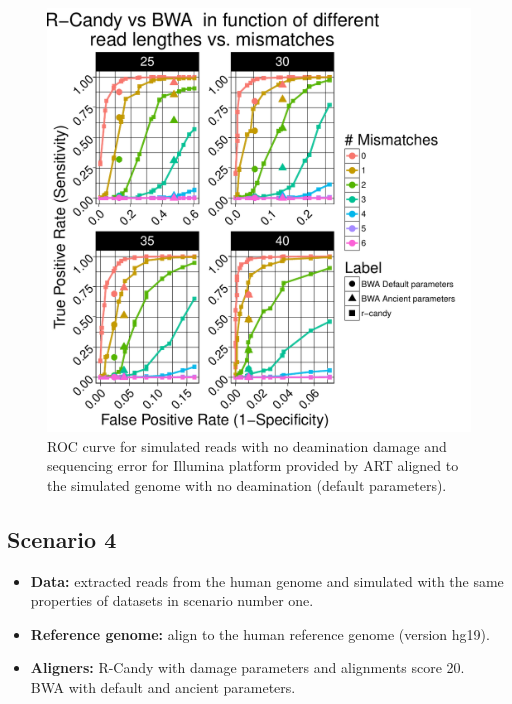 \documentclass[11pt,a4paper]{report}
\begin{document}
\begin{figure}[H]
\centering
\includegraphics[width=12cm]{pictures/bROC_DS3_ART.pdf}
\caption{ROC curve for simulated reads with no deamination damage and sequencing 
error for Illumina platform provided by ART aligned to the simulated genome
         with no deamination (default parameters).}
\label{DS3_ART}
\end{figure}


\subsection{Scenario 4}
 
  \begin{itemize}

   \item \textbf{Data:} extracted reads from the human genome and simulated 
with the same properties of datasets in scenario number one.
   
   \item \textbf{Reference genome:} align to the human reference genome (version hg19).
   
    \item \textbf{Aligners:} R-Candy with damage parameters and alignments score 20. \\
BWA with default and ancient parameters.
  \end{itemize}
 
\end{document}
